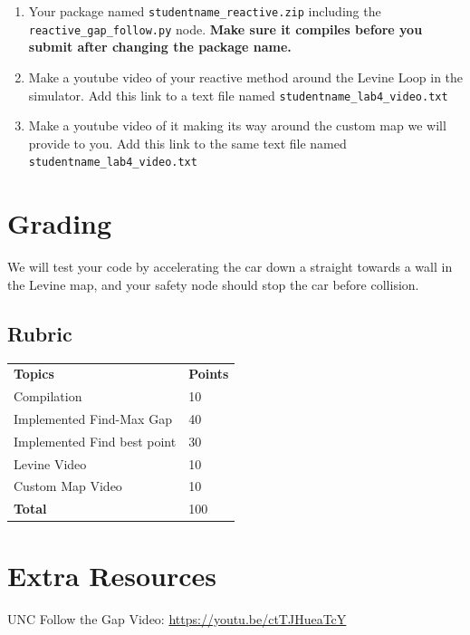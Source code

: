 \documentclass[letta4 paper]{article}
\numberwithin{equation}{section}
\newcommand{\0}{\mathbf{0}}
\begin{document}
	\begin{enumerate}
		\item Your package named \texttt{studentname\_reactive.zip} including the \texttt{reactive\_gap\_follow.py} node. \textbf{Make sure it compiles before you submit after changing the package name.}
		\item Make a youtube video of your reactive method around the Levine Loop in the simulator. Add this link to a text file named \texttt{studentname\_lab4\_video.txt}
		\item Make a youtube video of it making its way around the custom map we will provide to you. Add this link to the same text file named \texttt{studentname\_lab4\_video.txt}
	\end{enumerate}

	\section{Grading}
	
	We will test your code by accelerating the car down a straight towards a wall in the Levine map, and your safety node should stop the car before collision.
	
	\subsection{Rubric}
	\begin{table}[h]
		\begin{tabular}{ll}
			\textbf{Topics} & \textbf{Points} \\
			Compilation & 10 \\
			Implemented Find-Max Gap & 40 \\
			Implemented Find best point & 30 \\
			Levine Video & 10 \\
			Custom Map Video & 10 \\
			\textbf{Total} & 100 \\
		\end{tabular}
	\end{table}
	

	\section{Extra Resources}
	UNC Follow the Gap Video: \url{https://youtu.be/ctTJHueaTcY}
			
\end{document}
